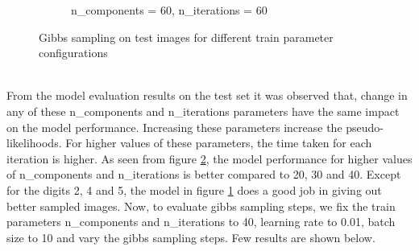 \begin{figure}[ht]
\begin{subfigure}[b]{0.33\textwidth}
		\caption{n\_components = 60, n\_iterations = 60}\label{fig:rbm_ncomp_60_itr_60)}
	\end{subfigure}%
	\caption{Gibbs sampling on test images for different train parameter configurations}
	\label{fig:rbm_dig}
\end{figure}\\
From the model evaluation results on the test set it was observed that, change in any of these n\_components and n\_iterations parameters have the same impact on the model performance. Increasing these parameters increase the pseudo-likelihoods. For higher values of these parameters, the time taken for each iteration is higher. As seen from figure \ref{fig:rbm_dig}, the model performance for higher values of n\_components and n\_iterations is better compared to 20, 30 and 40. Except for the digits 2, 4 and 5, the model in figure \ref{fig:rbm_ncomp_60_itr_60)} does a good job in giving out better sampled images.  Now, to evaluate gibbs sampling steps, we fix the train parameters n\_components and n\_iterations to 40, learning rate to 0.01, batch size to 10 and vary the gibbs sampling steps. Few results are shown below.
